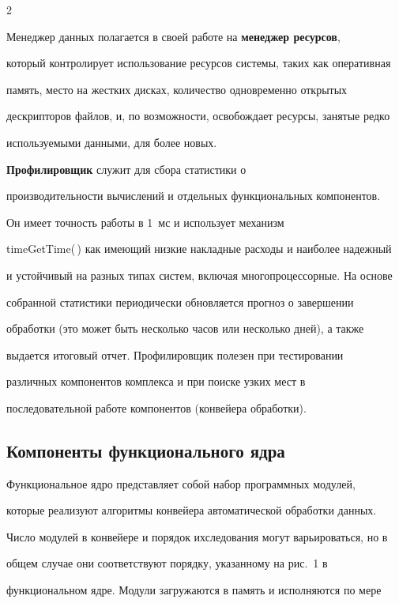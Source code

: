 \begin{multicols}{2}
   

   Менеджер данных полагается в своей работе на \textbf{менеджер ресурсов}, 

который контролирует использование ресурсов системы, таких как оперативная 

память, место на жестких дисках, количество одновременно открытых 

дескрипторов файлов, и, по возможности, освобождает ресурсы, занятые редко 

используемыми данными, для более новых.

   

   \textbf{Профилировщик} служит для сбора статистики о 

производительности вычислений и отдельных функциональных компонентов. 

Он имеет точность работы в 1~мс и использует механизм 

timeGetTime(\,) как имеющий низкие накладные расходы и наиболее надежный 

и устойчивый на разных типах систем, включая многопроцессорные. На основе 

собранной статистики периодически обновляется прогноз о завершении 

обработки (это может быть несколько часов или несколько дней), а также 

выдается итоговый отчет. Профилировщик полезен при тестировании 

различных компонентов комплекса и при поиске узких мест в 

последовательной работе компонентов (конвейера обработки).

   

\subsection{Компоненты функционального ядра} %



   Функциональное ядро представляет собой набор программных модулей, 

которые реализуют алгоритмы конвейера автоматической обработки  данных. 

Число модулей в конвейере и порядок их\linebreak следования могут варьироваться, но в 

общем случае они соответствуют порядку, указанному на рис.~1 в 

функциональном ядре. Модули загружаются в память и исполняются по мере 


\end{multicols}
